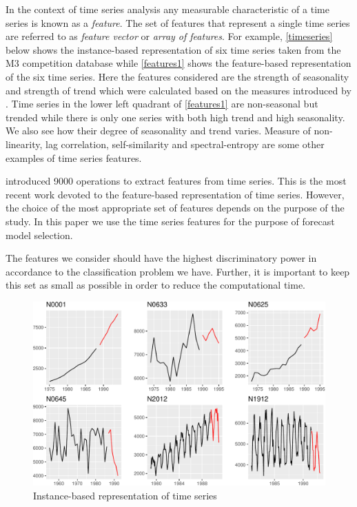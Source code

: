 \documentclass[11pt,a4paper,]{article}
\theoremstyle{definition}
\theoremstyle{definition}
\theoremstyle{definition}
\theoremstyle{remark}
\begin{document}
In the context of time series analysis any measurable characteristic of
a time series is known as a \emph{feature}. The set of features that
represent a single time series are referred to as \emph{feature vector}
or \emph{array of features}. For example, \autoref{timeseries} below
shows the instance-based representation of six time series taken from
the M3 competition database while \autoref{features1} shows the
feature-based representation of the six time series. Here the features
considered are the strength of seasonality and strength of trend which
were calculated based on the measures introduced by
\textcite{wang2009rule}. Time series in the lower left quadrant of
\autoref{features1} are non-seasonal but trended while there is only one
series with both high trend and high seasonality. We also see how their
degree of seasonality and trend varies. Measure of non-linearity, lag
correlation, self-similarity and spectral-entropy are some other
examples of time series features.

\textcite{fulcher2014highly} introduced 9000 operations to extract
features from time series. This is the most recent work devoted to the
feature-based representation of time series. However, the choice of the
most appropriate set of features depends on the purpose of the study. In
this paper we use the time series features for the purpose of forecast
model selection.

The features we consider should have the highest discriminatory power in
accordance to the classification problem we have. Further, it is
important to keep this set as small as possible in order to reduce the
computational time.

\begin{figure}

{\centering \includegraphics[width=\textwidth]{figure/fig1-1} 

}

\caption{Instance-based representation of time series\label{timeseries}}\label{fig:fig1}
\end{figure}
\end{document}
